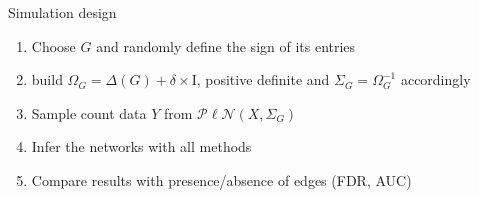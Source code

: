 \documentclass[11pt]{beamer}
\newcommand{\emphase}[1]{\textcolor{Complement}{#1}}
\begin{document}
\begin{frame}{Simulation design}

\begin{enumerate}
     \item Choose  \emphase{$G$} and randomly define the sign of its entries
     \item build \emphase{$\Omega_G = \Delta(G) + \delta\times \text{I}$}, positive definite and   \emphase{$\Sigma_G = \Omega_G^{-1}$} accordingly
     \item Sample count data \emphase{$Y$} from $\mathcal{P\ell N}(X,\Sigma_G)$ 
     \item Infer the networks with all methods
     \item Compare results with  presence/absence of edges (\emphase{FDR}, \emphase{AUC})
\end{enumerate}

\end{frame}

\end{document}
